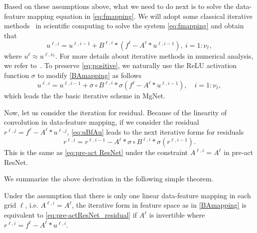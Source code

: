 Based on these assumptions above, what we need to do next is to
solve the data-feature mapping equation in \eqref{eq:fmapping}.
We will adopt some classical iterative methods~\cite{xu1992iterative} in scientific computing
to solve the system \eqref{eq:fmapping} and obtain that 
\begin{equation}\label{BAmapping}
u^{\ell,i} = u^{\ell,i-1} + B^{\ell,i} \ast (f^{\ell} - A^{\ell}\ast u^{\ell,i-1}),~ i = 1:\nu_\ell,
\end{equation}
where $u^{\ell} \approx u^{\ell,\nu_\ell}$. 
For more details about iterative methods
in numerical analysis, we refer to~\cite{xu1992iterative, hackbusch1994iterative, golub2012matrix}.
To preserve \eqref{eq:positive}, we naturally use the ReLU activation function $\sigma$
to modify \eqref{BAmapping} as follows
\begin{equation}
\label{eq:uBfAu}
u^{\ell,i} = u^{\ell,i-1} + \sigma \circ B^{\ell,i}\ast \sigma  (f^\ell -  A^\ell
\ast u^{\ell,i-1}), \quad i=1:\nu_\ell,
\end{equation}
which leads the the basic iterative scheme in MgNet.

Now, let us consider the iteration for residual. Because of the linearity of convolution in data-feature mapping,
if we consider the residual $r^{\ell,j} = f^{\ell} - A^{\ell}\ast u^{\ell,j}$, 
\eqref{eq:uBfAu} leads to the next iterative forms for residuals
\begin{equation}\label{eq:pre-actResNet_residual}
r^{\ell, i} = r^{\ell,i-1} - A^\ell \ast \sigma \circ B^{\ell,i}\ast \sigma(r^{\ell,i-1}).
\end{equation}
This is the same as \eqref{eq:pre-act ResNet} under the constraint $A^{\ell,i} = A^{\ell}$ in pre-act ResNet.

We summarize the above derivation in the following simple theorem.
\begin{theorem}\label{thm:1} Under the assumption that there is only
	one linear data-feature mapping in each grid $\ell$, i.e. $A^{\ell,i} = A^{\ell}$, 
	the iterative form in feature space as in \eqref{BAmapping} is equivalent to 
	\eqref{eq:pre-actResNet_residual} if $A^\ell$ is invertible where $r^{\ell,i} = f^\ell - A^{\ell}\ast u^{\ell,i}$.
\end{theorem}

